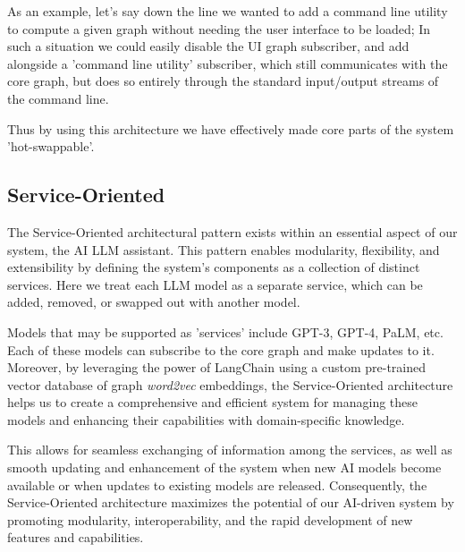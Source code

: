 \documentclass[11pt,a4paper]{article}
\begin{document}
As an example, let's say down the line we wanted to add a command line utility
to compute a given graph without needing the user interface to be loaded; In
such a situation we could easily disable the UI graph subscriber, and add
alongside a 'command line utility' subscriber, which still communicates with the
core graph, but does so entirely through the standard input/output streams of
the command line.

Thus by using this architecture we have effectively made core parts of the
system 'hot-swappable'.

\subsection{Service-Oriented}
The Service-Oriented architectural pattern exists within an essential aspect of our system, the AI LLM assistant.
This pattern enables modularity, flexibility, and extensibility by defining the system's components as a collection of distinct services.
Here we treat each LLM model as a separate service, which can be added, removed, or swapped out with another model.

Models that may be supported as 'services' include GPT-3, GPT-4, PaLM, etc.
Each of these models can subscribe to the core graph and make updates to it.
Moreover, by leveraging the power of LangChain using a custom pre-trained vector database of graph {\it word2vec} embeddings,
the Service-Oriented architecture helps us to create a comprehensive and efficient system for managing these models and enhancing their capabilities with domain-specific knowledge.

This allows for seamless exchanging of information among the services, as well as smooth updating and enhancement of the system when new AI models become available or when updates to existing models are released.
Consequently, the Service-Oriented architecture maximizes the potential of our AI-driven system by promoting modularity, interoperability, and the rapid development of new features and capabilities.


\end{document}
